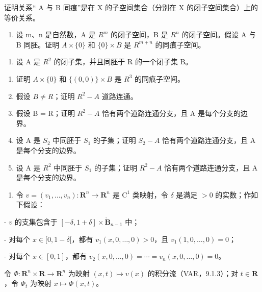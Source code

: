 证明关系“ A 与 B 同痕”是在 X 的子空间集合（分别在 X 的闭子空间集合）上的等价关系。

\begin{enumerate}
\def\labelenumi{\alph{enumi})}
\setcounter{enumi}{2}
\tightlist
\item
  设 m、n 是自然数，A 是 \(R^{m}\) 的闭子空间，B 是 \(R^{n}\) 的闭子空间。假设 A 与 B 同胚。证明 \(A \times \{0\}\) 和 \(\{0\} \times B\) 是 \(R^{m+n}\) 的同痕子空间。
\end{enumerate}

\begin{enumerate}
\def\labelenumi{\arabic{enumi})}
\setcounter{enumi}{28}
\tightlist
\item
  设 A 是 \(R^{2}\) 的闭子集，并且同胚于 R 的一个闭子集 B。
\end{enumerate}

\begin{enumerate}
\def\labelenumi{\alph{enumi})}
\item
  证明 \(A \times \{0\}\) 和 \(\{(0,0)\} \times B\) 是 \(R^{3}\) 的同痕子空间。
\item
  假设 \(B \neq R\)；证明 \(R^{2}-A\) 道路连通。
\item
  假设 B = R；证明 \(R^{2}-A\) 恰有两个道路连通分支，且 A 是每个分支的边界。
\item
  设 A 是 \(S_{2}\) 中同胚于 \(S_{1}\) 的子集；证明 \(S_{2} - A\) 恰有两个道路连通分支，且 A 是每个分支的边界。
\item
  设 A 是 \(R^{2}\) 中同胚于 \(S_{1}\) 的子集；证明 \(R^{2}-A\) 恰有两个道路连通分支，且 A 是每个分支的边界。
\end{enumerate}

\begin{enumerate}
\def\labelenumi{\arabic{enumi})}
\setcounter{enumi}{29}
\tightlist
\item
  令 \(v = (v_{1},\ldots ,v_{n})\colon \mathbf{R}^{n}\to \mathbf{R}^{n}\) 是 \(\mathrm{C}^1\) 类映射，令 \(\delta\) 是满足 \(>0\) 的实数；作如下假设：
\end{enumerate}

- \(v\) 的支集包含于 \([- \delta, 1 + \delta] \times \mathring{\mathbf{B}}_{n-1}\) 中；

- 对每个 \(x \in [0, 1 - \delta[\)，都有 \(v_1(x, 0, \ldots, 0) > 0\)，且 \(v_1(1, 0, \ldots, 0) = 0\)；

- 对每个 \(x \in [0,1]\)，都有 \(v_{2}(x,0,\ldots,0) = \cdots = v_{n}(x,0,\ldots,0) = 0\)。

  令 \(\Phi\colon\mathbf{R}^{n}\times\mathbf{R}\to\mathbf{R}^{n}\) 为映射 \((x,t)\mapsto v(x)\) 的积分流（VAR，9.1.3）；对 \(t\in\mathbf{R}\)，令 \(\Phi_{t}\) 为映射 \(x\mapsto\Phi(x,t)\)。

